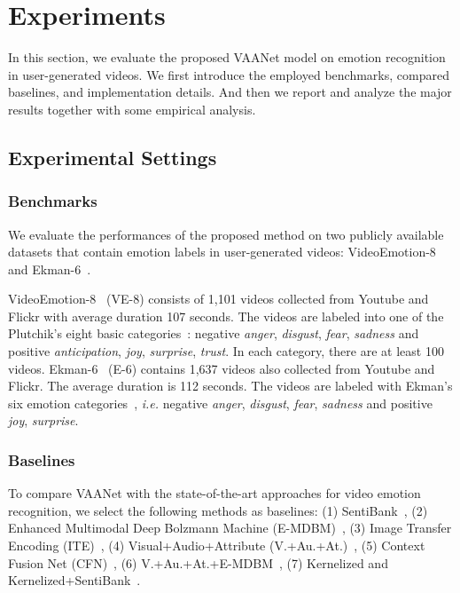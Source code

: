 \documentclass[letterpaper]{article} \usepackage{aaai20}  \usepackage{times}  \usepackage{helvet} \usepackage{courier}  \usepackage[hyphens]{url}  \usepackage{graphicx} \urlstyle{rm} \def\UrlFont{\rm}  \usepackage{graphicx}
\begin{document}
\section{Experiments}
\label{sec:Experiments}

In this section, we evaluate the proposed VAANet model on emotion recognition in user-generated videos. We first introduce the employed benchmarks, compared baselines, and implementation details. And then we report and analyze the major results together with some empirical analysis.


\subsection{Experimental Settings}
\label{ssec:Settings}

\subsubsection{Benchmarks}
\label{sssec:Benchmarks}
We evaluate the performances of the proposed method on two publicly available datasets that contain emotion labels in user-generated videos: VideoEmotion-8~\cite{jiang2014predicting} and Ekman-6~\cite{xu2018heterogeneous}.

VideoEmotion-8~\cite{jiang2014predicting} (VE-8) consists of 1,101 videos collected from Youtube and Flickr with average duration 107 seconds. The videos are labeled into one of the Plutchik's eight basic categories~\cite{plutchik1980emotion}: negative \textit{anger}, \textit{disgust}, \textit{fear}, \textit{sadness} and positive \textit{anticipation}, \textit{joy}, \textit{surprise}, \textit{trust}. In each category, there are at least 100 videos. Ekman-6~\cite{xu2018heterogeneous} (E-6) contains 1,637 videos also collected from Youtube and Flickr. The average duration is 112 seconds. The videos are labeled with Ekman's six emotion categories~\cite{ekman1992argument}, \textit{i.e.}  negative \textit{anger}, \textit{disgust}, \textit{fear}, \textit{sadness} and positive \textit{joy}, \textit{surprise}.



\subsubsection{Baselines}
\label{sssec:Baselines}
To compare VAANet with the state-of-the-art approaches for video emotion recognition, we select the following methods as baselines: (1) SentiBank~\cite{borth2013sentibank}, (2) Enhanced Multimodal Deep
Bolzmann Machine (E-MDBM)~\cite{pang2015deep}, (3)  Image Transfer Encoding (ITE)~\cite{xu2018heterogeneous}, (4) Visual+Audio+Attribute (V.+Au.+At.)~\cite{jiang2014predicting}, (5) Context Fusion Net (CFN)~\cite{chen2016emotion}, (6) V.+Au.+At.+E-MDBM~\cite{pang2015deep}, (7) Kernelized and Kernelized+SentiBank~\cite{zhang2018recognition}.
\end{document}
